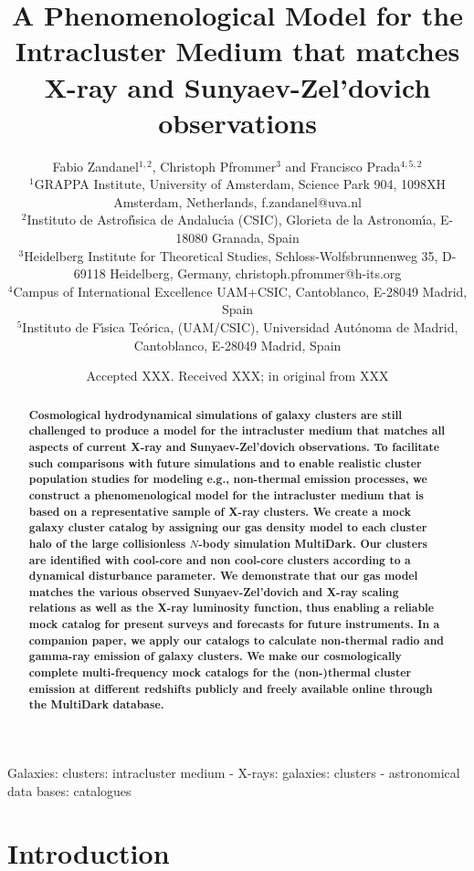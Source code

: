 \documentclass[useAMS,usenatbib]{mn2e}
\title[A Phenomenological Model for the Intracluster Medium]{A Phenomenological Model for the Intracluster Medium that matches X-ray and Sunyaev-Zel'dovich observations}
\author[F. Zandanel, C. Pfrommer and F. Prada]{
Fabio Zandanel$^{1,2}$, Christoph Pfrommer$^{3}$ and Francisco Prada$^{4,5,2}$\\
$^{1}$GRAPPA Institute, University of Amsterdam, Science Park 904, 1098XH Amsterdam, Netherlands, f.zandanel@uva.nl\\
$^{2}$Instituto de Astrof\'{\i}sica de Andaluc\'{\i}a (CSIC), Glorieta de la Astronom\'{\i}a, E-18080 Granada, Spain\\
$^{3}$Heidelberg Institute for Theoretical Studies, Schloss-Wolfsbrunnenweg 35, D-69118 Heidelberg, Germany, christoph.pfrommer@h-its.org\\
$^{4}$Campus of International Excellence UAM+CSIC, Cantoblanco, E-28049 Madrid, Spain\\
$^{5}$Instituto de F\'{\i}sica Te\'orica, (UAM/CSIC), Universidad Aut\'onoma de Madrid, Cantoblanco, E-28049 Madrid, Spain}
\begin{document}
\date{Accepted XXX. Received XXX; in original from XXX}

\pagerange{\pageref{firstpage}--\pageref{lastpage}} 

\maketitle

\label{firstpage}

\begin{abstract}
  {\bf Cosmological hydrodynamical simulations of galaxy clusters are still
    challenged to produce a model for the intracluster medium that matches all
    aspects of current X-ray and Sunyaev-Zel'dovich observations. To facilitate
    such comparisons with future simulations and to enable realistic cluster
    population studies for modeling e.g., non-thermal emission processes, we
    construct a phenomenological model for the intracluster medium that is based
    on a representative sample of X-ray clusters. We create a mock galaxy
    cluster catalog by assigning our gas density model to each cluster halo of
    the large collisionless $N$-body simulation MultiDark. Our clusters are
    identified with cool-core and non cool-core clusters according to a
    dynamical disturbance parameter. We demonstrate that our gas model matches
    the various observed Sunyaev-Zel'dovich and X-ray scaling relations as well
    as the X-ray luminosity function, thus enabling a reliable mock catalog for
    present surveys and forecasts for future instruments. In a companion paper,
    we apply our catalogs to calculate non-thermal radio and gamma-ray emission
    of galaxy clusters. We make our cosmologically complete multi-frequency mock
    catalogs for the (non-)thermal cluster emission at different redshifts
    publicly and freely available online through the MultiDark database.}
\end{abstract}

\begin{keywords}
  Galaxies: clusters: intracluster medium - X-rays: galaxies: clusters - astronomical data bases: catalogues
\end{keywords}


\section{Introduction}
\label{sec:1}
\end{document}
